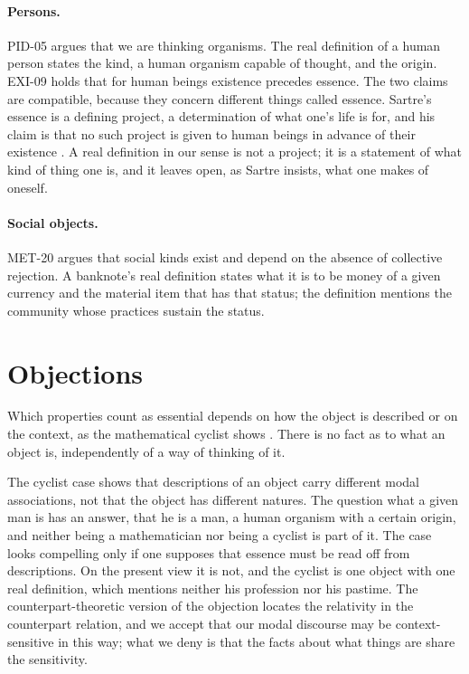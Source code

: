\documentclass{situationist-preprint}
\begin{document}
\paragraph{Persons.} PID-05 argues that we are thinking organisms. The real definition of a human person states the kind, a human organism capable of thought, and the origin. EXI-09 holds that for human beings existence precedes essence. The two claims are compatible, because they concern different things called essence. Sartre's essence is a defining project, a determination of what one's life is for, and his claim is that no such project is given to human beings in advance of their existence \citep{Sartre1946}. A real definition in our sense is not a project; it is a statement of what kind of thing one is, and it leaves open, as Sartre insists, what one makes of oneself.

\paragraph{Social objects.} MET-20 argues that social kinds exist and depend on the absence of collective rejection. A banknote's real definition states what it is to be money of a given currency and the material item that has that status; the definition mentions the community whose practices sustain the status.

\section{Objections}\label{s:objections}

\begin{objection}\label{o:quine}
Which properties count as essential depends on how the object is described or on the context, as the mathematical cyclist shows \citep[§41]{Quine1960}. There is no fact as to what an object is, independently of a way of thinking of it.
\end{objection}

\begin{reply}
The cyclist case shows that descriptions of an object carry different modal associations, not that the object has different natures. The question what a given man is has an answer, that he is a man, a human organism with a certain origin, and neither being a mathematician nor being a cyclist is part of it. The case looks compelling only if one supposes that essence must be read off from descriptions. On the present view it is not, and the cyclist is one object with one real definition, which mentions neither his profession nor his pastime. The counterpart-theoretic version of the objection \citep{Lewis1986} locates the relativity in the counterpart relation, and we accept that our modal discourse may be context-sensitive in this way; what we deny is that the facts about what things are share the sensitivity.
\end{reply}
\end{document}
